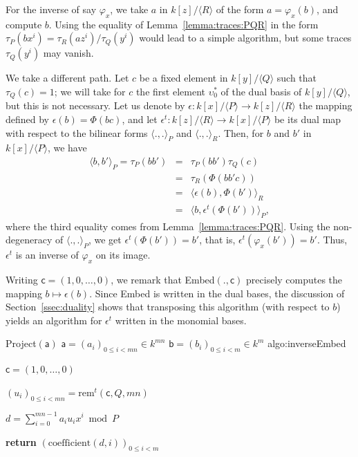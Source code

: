 \documentclass{sig-alternate}
\def\va {\ensuremath{\mathsf{a}}}
\def\vb {\ensuremath{\mathsf{b}}}
\def\vc {\ensuremath{\mathsf{c}}}
\def\rem {\ensuremath{\mathrm{rem}}}
\def\coeff {\ensuremath{\mathrm{coefficient}}}
\newcounter{algo}
\newenvironment{algorithm_endline}[4]{\small\begin{center}\begin{minipage}{0.48\textwidth}
      \refstepcounter{algo}
      \label{#4}
      \sf
      \rule{\textwidth}{0.2pt}\\
      \makebox[\textwidth][c]{Algorithm~\arabic{algo}:~\textbf{#1}}\\
      \rule[0.5\baselineskip]{\textwidth}{0.2pt}\\

      \vspace{-12pt}

      \parbox{\textwidth}{\textbf{Input} #2}
      \parbox{\textwidth}{\textbf{Output} #3}

\vspace{-7pt}

      \begin{enumerate*}}{\end{enumerate*}
      \vspace{-11pt}
      \rule{\textwidth}{0.2pt}
\end{minipage}\end{center}
}
\newcommand{\ang}[1]{\langle#1\rangle}
\begin{document}
For the inverse of say $\varphi_x$, we take $a$ in $k[z]/\langle R
\rangle$ of the form $a=\varphi_x(b)$, and compute $b$. Using the
equality of Lemma~\ref{lemma:traces:PQR} in the form $\tau_P(b x^i)
=\tau_R(a z^i)/\tau_Q(y^i)$ would lead to a simple algorithm, but some
traces $\tau_Q(y^i)$ may vanish. 

We take a different path. Let $c$ be a fixed element in $k[y]/\ang{Q}$
such that $\tau_Q(c)=1$; we will take for $c$ the first element
$\upsilon^\ast_0$ of the dual basis of $k[y]/\ang{Q}$, but this is not
necessary. Let us denote by $\epsilon: k[x]/\ang{P} \to k[z]/\ang{R}$
the mapping defined by $\epsilon(b) = \Phi(b c)$, and let $\epsilon^t:
k[z]/\ang{R} \to k[x]/\ang{P}$ be its dual map with respect to the
bilinear forms $\ang{.,.}_P$ and $\ang{.,.}_R$. Then, for $b$ and $b'$
in $k[x]/\ang{P}$, we have
\begin{eqnarray*}
\ang{b,b'}_P = \tau_P(b b') &=&  \tau_P(b b')\tau_Q(c) \\
&=& \tau_R( \Phi(b b' c))\\
&=& \ang{\epsilon(b), \Phi(b')}_R \\
&=& \ang{b, \epsilon^t(\Phi(b'))}_P,
\end{eqnarray*}
where the third equality comes from
Lemma~\ref{lemma:traces:PQR}. Using the non-degeneracy of
$\ang{.,.}_P$, we get $\epsilon^t(\Phi(b')) = b'$, that is,
$\epsilon^t(\varphi_x(b')) = b'$. Thus, $\epsilon^t$ is an inverse of
$\varphi_x$ on its image.

Writing $\vc=(1,0,\dots,0)$, we remark that {\sf Embed}$(.,\vc)$ precisely
computes the mapping $b\mapsto \epsilon(b)$. Since {\sf Embed} is written in
the dual bases, the discussion of Section~\ref{ssec:duality} shows
that transposing this algorithm (with respect to $b$) yields an
algorithm for $\epsilon^t$ written in the monomial bases. 

\begin{algofloat}[t]
\begin{algorithm_endline}
{Project$(\va)$}
{$\va=(a_i)_{0 \le i < mn} \in k^{mn}$}
{$\vb=(b_i)_{0 \le i < m} \in k^m$}
{algo:inverseEmbed}
\item $\vc=(1,0,\dots,0)$ 
\item  $(u_i)_{0\le i<mn} = \rem^t(\vc,Q,mn)$
\item \label{algo:inverseEmbed:dotprod} $d = \sum_{i=0}^{mn-1} a_i u_i x^i  \bmod P$
\item {\bf return} \label{algo:inverseEmbed:mod} $(\coeff(d,i))_{0 \le i < m}$
\end{algorithm_endline}
\vspace{-5ex}
\end{algofloat}
\end{document}

